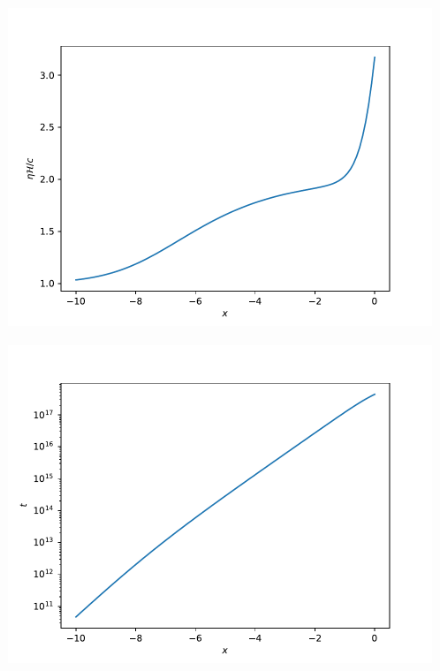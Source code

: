 \documentclass{aa}
\begin{document}
\begin{figure}[ht]
\centering
\includegraphics[width=\hsize]{figures/etaHp_over_c.pdf}
  \caption{}
     \label{}
\end{figure}

\begin{figure}[ht]
\centering
\includegraphics[width=\hsize]{figures/t.pdf}
  \caption{}
     \label{}
\end{figure}
\end{document}
